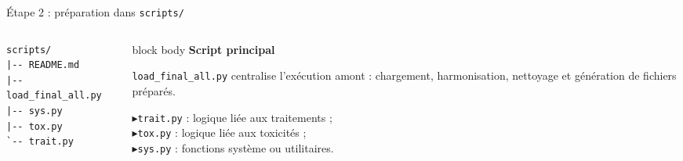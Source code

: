 \documentclass[10pt,aspectratio=169]{beamer}
\newcommand{\smallbullet}{\textcolor{MainBlue}{$\blacktriangleright$}\hspace{0.4em}}
\newenvironment{infobox}[1]
{\begin{beamercolorbox}[rounded=true,shadow=false,wd=\linewidth,sep=0.8em]{block body}
\textbf{\color{DarkBlue}#1}\par\vspace{0.3em}}
{\end{beamercolorbox}}
\begin{document}
\begin{frame}[fragile]{Étape 2 : préparation dans \texttt{scripts/}}
\begin{columns}[T,onlytextwidth]
\begin{column}{0.44\linewidth}
\begin{lstlisting}
scripts/
|-- README.md
|-- load_final_all.py
|-- sys.py
|-- tox.py
`-- trait.py
\end{lstlisting}
\end{column}

\begin{column}{0.52\linewidth}
\begin{infobox}{Script principal}
\texttt{load\_final\_all.py} centralise l'exécution amont : chargement, harmonisation, nettoyage et génération de fichiers préparés.

\vspace{0.5em}
\smallbullet \texttt{trait.py} : logique liée aux traitements ;\\
\smallbullet \texttt{tox.py} : logique liée aux toxicités ;\\
\smallbullet \texttt{sys.py} : fonctions système ou utilitaires.
\end{infobox}
\end{column}
\end{columns}
\end{frame}
\end{document}
